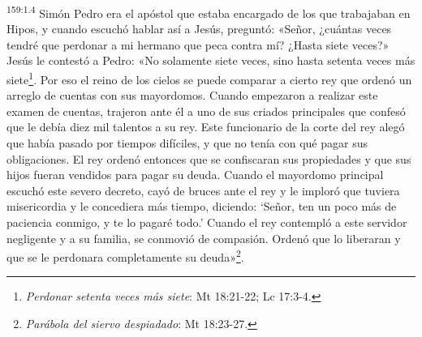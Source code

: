 \par
\textsuperscript{159:1.4} Simón Pedro era el apóstol que estaba encargado de los que trabajaban en Hipos, y cuando escuchó hablar así a Jesús, preguntó: «Señor, ¿cuántas veces tendré que perdonar a mi hermano que peca contra mí? ¿Hasta siete veces?» Jesús le contestó a Pedro: «No solamente siete veces, sino hasta setenta veces más siete\footnote{\textit{Perdonar setenta veces más siete}: Mt 18:21-22; Lc 17:3-4.}. Por eso el reino de los cielos se puede comparar a cierto rey que ordenó un arreglo de cuentas con sus mayordomos. Cuando empezaron a realizar este examen de cuentas, trajeron ante él a uno de sus criados principales que confesó que le debía diez mil talentos a su rey. Este funcionario de la corte del rey alegó que había pasado por tiempos difíciles, y que no tenía con qué pagar sus obligaciones. El rey ordenó entonces que se confiscaran sus propiedades y que sus hijos fueran vendidos para pagar su deuda. Cuando el mayordomo principal escuchó este severo decreto, cayó de bruces ante el rey y le imploró que tuviera misericordia y le concediera más tiempo, diciendo: `Señor, ten un poco más de paciencia conmigo, y te lo pagaré todo.' Cuando el rey contempló a este servidor negligente y a su familia, se conmovió de compasión. Ordenó que lo liberaran y que se le perdonara completamente su deuda»\footnote{\textit{Parábola del siervo despiadado}: Mt 18:23-27.}.

